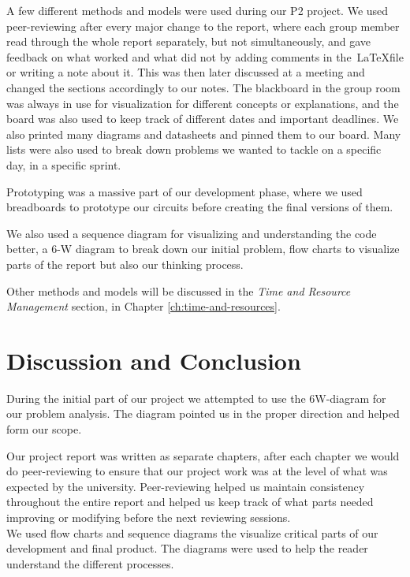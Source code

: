 A few different methods and models were used during our P2 project. We used peer-reviewing after every major change to the report, where each group member read through the whole report separately, but not simultaneously, and gave feedback on what worked and what did not by adding comments in the~\LaTeX file or writing a note about it. This was then later discussed at a meeting and changed the sections accordingly to our notes. The blackboard in the group room was always in use for visualization for different concepts or explanations, and the board was also used to keep track of different dates and important deadlines. We also printed many diagrams and datasheets  and pinned them to our board. Many lists were also used to break down problems we wanted to tackle on a specific day, in a specific sprint.

Prototyping was a massive part of our development phase, where we used breadboards to prototype our circuits before creating the final versions of them.

We also used a sequence diagram for visualizing and understanding the code better, a 6-W diagram to break down our initial problem, flow charts to visualize parts of the report but also our thinking process.

Other methods and models will be discussed in the \textit{Time and Resource Management} section, in Chapter \ref{ch:time-and-resources}.

\section{Discussion and Conclusion}

During the initial part of our project we attempted to use the 6W-diagram for our problem analysis. The diagram pointed us in the proper direction and helped form our scope.

Our project report was written as separate chapters, after each chapter we would do peer-reviewing to ensure that our project work was at the level of what was expected by the university. Peer-reviewing helped us maintain consistency throughout the entire report and helped us keep track of what parts needed improving or modifying before the next reviewing sessions.
\\
We used flow charts and sequence diagrams the visualize critical parts of our development and final product. The diagrams were used to help the reader understand the different processes. 
